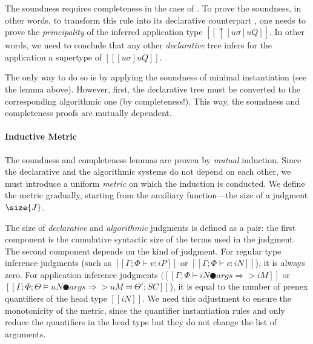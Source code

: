 The soundness requires completeness in the case of
. To prove the soundness, in other words, to
transform this rule into its declarative counterpart
, one needs to prove the \emph{principality} of
the inferred application type $[[↑[uσ]uQ]]$. In other words, we need to conclude
that any other \emph{declarative} tree infers for the application a supertype of
$[[ [uσ]uQ ]]$. 

The only way to do so is by applying the soundness of minimal instantiation
(see the lemma above). However, first, the declarative
tree must be converted to the corresponding algorithmic one (by completeness!).
This way, the soundness and completeness proofs are mutually dependent.

\paragraph*{Inductive Metric}
    The soundness and completeness lemmas are proven by \emph{mutual} induction. 
    Since the declarative and the algorithmic systems do not depend on each other,
    we must introduce a uniform \emph{metric} on which the induction is conducted.
    We define the metric gradually, starting from the
    auxiliary function---the size of a judgment $\size{J}$.

    The size of \emph{declarative} and \emph{algorithmic} judgments is defined
    as a pair: the first component is the cumulative syntactic size of the terms
    used in the judgment. The second component depends on the kind of judgment.
    For regular type inference judgments (such as $[[Γ ; Φ ⊢ v : iP]]$ or 
    $[[Γ ; Φ ⊨ c : iN]]$), it is always zero. For application inference judgments $([[Γ
    ; Φ ⊢ iN ● args ⇒> iM]]$ or $[[Γ ; Φ ; Θ ⊨ uN ● args ⇒> uM ⫤ Θ'; SC]]$), it
    is equal to the number of prenex quantifiers of the head type $[[iN]]$. We
    need this adjustment to ensure the monotonicity of the metric, since the
    quantifier instantiation rules  and
     only reduce the quantifiers in the head
    type but they do not change the list of arguments.

